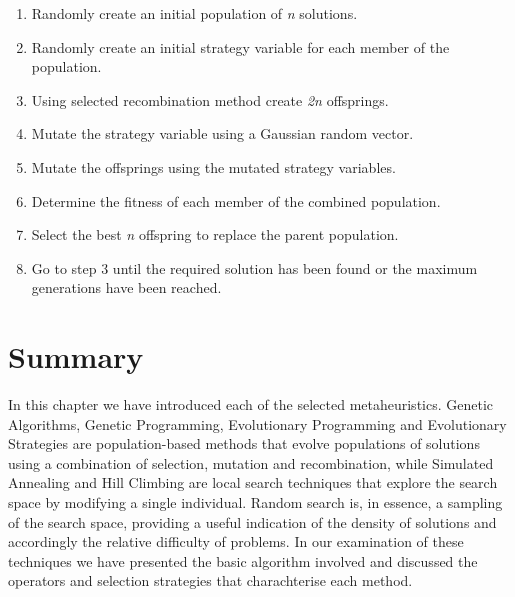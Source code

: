 \begin{center}
\begin{enumerate}
\item Randomly create an initial population of \emph{n} solutions.
\item Randomly create an initial strategy variable for each member of the population. 
\item Using selected recombination method create \emph{2n} offsprings.
\item Mutate the strategy variable using a Gaussian random vector.
\item Mutate the offsprings using the mutated strategy variables.
\item Determine the fitness of each member of the combined population. 
\item Select the best \emph{n} offspring to replace the parent population.
\item Go to step 3 until the required solution has been found or the maximum generations  have been reached. 
\end{enumerate}
\end{center}



\section{Summary}
In this chapter we have introduced each of the selected metaheuristics. Genetic Algorithms, Genetic Programming, Evolutionary Programming and Evolutionary Strategies are population-based methods that evolve populations of solutions using a combination of selection, mutation and recombination, while Simulated Annealing and Hill Climbing are local search techniques that explore the search space by modifying a single individual. Random search is, in essence, a sampling of the search space, providing a useful indication of the density of solutions and accordingly the relative difficulty of problems. In our examination of these techniques we have presented the basic algorithm involved and discussed the operators and selection strategies that charachterise each method.











